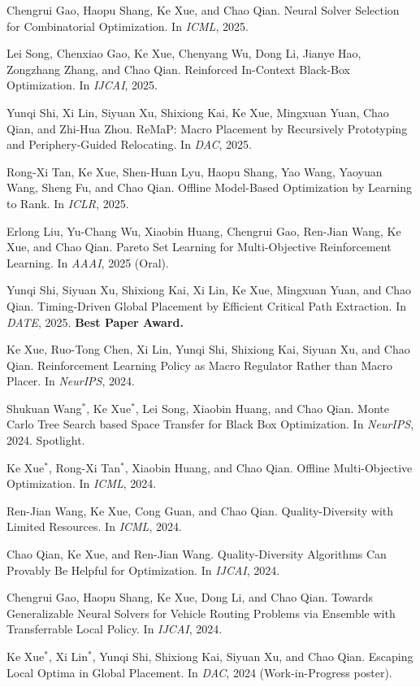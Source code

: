 \documentclass[10pt,a4paper]{article}
\begin{document}
\begin{cvbullet}
  \item Chengrui Gao, Haopu Shang, Ke Xue, and Chao Qian. Neural Solver Selection for Combinatorial Optimization. In \textit{ICML}, 2025.
  \item Lei Song, Chenxiao Gao, Ke Xue, Chenyang Wu, Dong Li, Jianye Hao, Zongzhang Zhang, and Chao Qian. Reinforced In-Context Black-Box Optimization. In \textit{IJCAI}, 2025.
  \item Yunqi Shi, Xi Lin, Siyuan Xu, Shixiong Kai, Ke Xue, Mingxuan Yuan, Chao Qian, and Zhi-Hua Zhou. ReMaP: Macro Placement by Recursively Prototyping and Periphery-Guided Relocating. In \textit{DAC}, 2025.
  \item Rong-Xi Tan, Ke Xue, Shen-Huan Lyu, Haopu Shang, Yao Wang, Yaoyuan Wang, Sheng Fu, and Chao Qian. Offline Model-Based Optimization by Learning to Rank. In \textit{ICLR}, 2025.
  \item Erlong Liu, Yu-Chang Wu, Xiaobin Huang, Chengrui Gao, Ren-Jian Wang, Ke Xue, and Chao Qian. Pareto Set Learning for Multi-Objective Reinforcement Learning. In \textit{AAAI}, 2025 (Oral).
  \item Yunqi Shi, Siyuan Xu, Shixiong Kai, Xi Lin, Ke Xue, Mingxuan Yuan, and Chao Qian. Timing-Driven Global Placement by Efficient Critical Path Extraction. In \textit{DATE}, 2025. \textbf{Best Paper Award.}
  \item Ke Xue, Ruo-Tong Chen, Xi Lin, Yunqi Shi, Shixiong Kai, Siyuan Xu, and Chao Qian. Reinforcement Learning Policy as Macro Regulator Rather than Macro Placer. In \textit{NeurIPS}, 2024.
  \item Shukuan Wang$^*$, Ke Xue$^*$, Lei Song, Xiaobin Huang, and Chao Qian. Monte Carlo Tree Search based Space Transfer for Black Box Optimization. In \textit{NeurIPS}, 2024. Spotlight.
  \item Ke Xue$^*$, Rong-Xi Tan$^*$, Xiaobin Huang, and Chao Qian. Offline Multi-Objective Optimization. In \textit{ICML}, 2024.
  \item Ren-Jian Wang, Ke Xue, Cong Guan, and Chao Qian. Quality-Diversity with Limited Resources. In \textit{ICML}, 2024.
  \item Chao Qian, Ke Xue, and Ren-Jian Wang. Quality-Diversity Algorithms Can Provably Be Helpful for Optimization. In \textit{IJCAI}, 2024.
  \item Chengrui Gao, Haopu Shang, Ke Xue, Dong Li, and Chao Qian. Towards Generalizable Neural Solvers for Vehicle Routing Problems via Ensemble with Transferrable Local Policy. In \textit{IJCAI}, 2024.
  \item Ke Xue$^*$, Xi Lin$^*$, Yunqi Shi, Shixiong Kai, Siyuan Xu, and Chao Qian. Escaping Local Optima in Global Placement. In \textit{DAC}, 2024 (Work-in-Progress poster).

\end{cvbullet}
\end{document}

